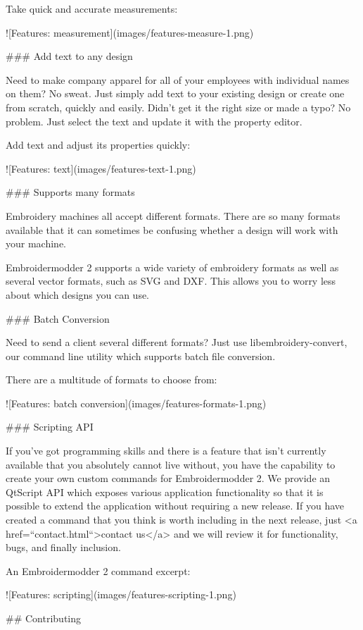 Take quick and accurate measurements:

![Features: measurement](images/features-measure-1.png)

### Add text to any design

Need to make company apparel for all of your employees with individual names on them? No sweat. Just simply add text to your existing design or create one from scratch, quickly and easily.
Didn't get it the right size or made a typo? No problem. Just select the text and update it with the property editor.

Add text and adjust its properties quickly:

![Features: text](images/features-text-1.png)

### Supports many formats

Embroidery machines all accept different formats. There are so many formats available that it can sometimes be confusing whether a design will work with your machine.

Embroidermodder 2 supports a wide variety of embroidery formats as well as several vector formats, such as SVG and DXF. This allows you to worry less about which designs you can use.

### Batch Conversion

Need to send a client several different formats? Just use libembroidery-convert, our command line utility which supports batch file conversion.

There are a multitude of formats to choose from:

![Features: batch conversion](images/features-formats-1.png)

### Scripting API

If you've got programming skills and there is a feature that isn't currently available that you absolutely cannot live without, you have the capability to create your own custom commands for Embroidermodder 2. We provide an QtScript API which exposes various application functionality so that it is possible to extend the application without requiring a new release. If you have created a command that you think is worth including in the next release, just <a href=``contact.html``>contact us</a> and we will review it for functionality, bugs, and finally inclusion.

An Embroidermodder 2 command excerpt:

![Features: scripting](images/features-scripting-1.png)

## Contributing

